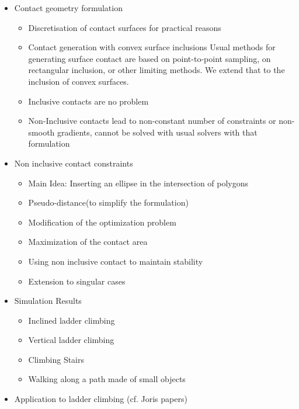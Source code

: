 \begin{itemize}
  \item Contact geometry formulation
    \begin{itemize}
      \item Discretisation of contact surfaces for practical reasons
      \item Contact generation with convex surface inclusions
Usual methods for generating surface contact are based on point-to-point sampling, on rectangular inclusion, or other limiting methods. We extend that to the inclusion of convex surfaces.
      \item Inclusive contacts are no problem
      \item Non-Inclusive contacts lead to non-constant number of constraints or non-smooth gradients, cannot be solved with usual solvers with that formulation
    \end{itemize}
  \item{Non inclusive contact constraints}
    \begin{itemize}
      \item {Main Idea: Inserting an ellipse in the intersection of polygons}
      \item {Pseudo-distance(to simplify the formulation)}
      \item {Modification of the optimization problem}
      \item {Maximization of the contact area}
      \item {Using non inclusive contact to maintain stability}
      \item {Extension to singular cases}
    \end{itemize}
  \item{Simulation Results}
    \begin{itemize}
      \item{Inclined ladder climbing}
      \item{Vertical ladder climbing}
      \item{Climbing Stairs}
      \item{Walking along a path made of small objects}
    \end{itemize}
  \item{Application to ladder climbing (cf. Joris papers)}
\end{itemize}

